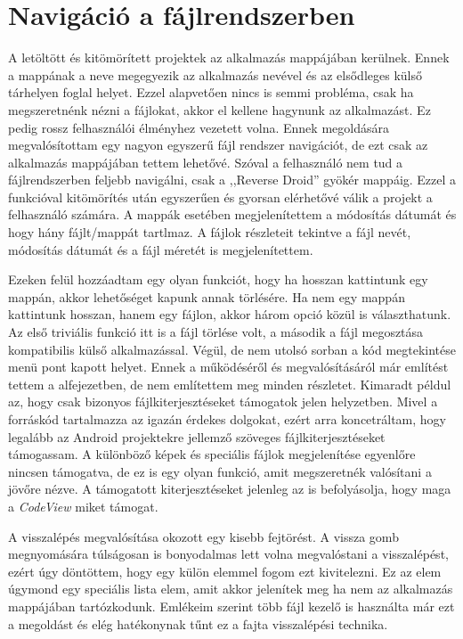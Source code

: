 \documentclass{thesis-ekf}
\theoremstyle{definition}
\theoremstyle{remark}
\begin{document}
\section{Navigáció a fájlrendszerben}

A letöltött és kitömörített projektek az alkalmazás mappájában kerülnek.
Ennek a mappának a neve megegyezik az alkalmazás nevével és az elsődleges külső tárhelyen foglal helyet.
Ezzel alapvetően nincs is semmi probléma, csak ha megszeretnénk nézni a fájlokat, akkor el kellene hagynunk az alkalmazást.
Ez pedig rossz felhasználói élményhez vezetett volna.
Ennek megoldására megvalósítottam egy nagyon egyszerű fájl rendszer navigációt, de ezt csak az alkalmazás mappájában tettem lehetővé.
Szóval a felhasználó nem tud a fájlrendszerben feljebb navigálni, csak a ,,Reverse Droid'' gyökér mappáig.
Ezzel a funkcióval kitömörítés után egyszerűen és gyorsan elérhetővé válik a projekt a felhasználó számára.
A mappák esetében megjelenítettem a módosítás dátumát és hogy hány fájlt/mappát tartlmaz.
A fájlok részleteit tekintve a fájl nevét, módosítás dátumát és a fájl méretét is megjelenítettem.

Ezeken felül hozzáadtam egy olyan funkciót, hogy ha hosszan kattintunk egy mappán, akkor lehetőséget kapunk annak törlésére.
Ha nem egy mappán kattintunk hosszan, hanem egy fájlon, akkor három opció közül is választhatunk.
Az első triviális funkció itt is a fájl törlése volt, a második a fájl megosztása kompatibilis külső alkalmazással.
Végül, de nem utolsó sorban a kód megtekintése menü pont kapott helyet.
Ennek a működéséről és megvalósításáról már említést tettem a  alfejezetben, de nem említettem meg minden részletet.
Kimaradt példul az, hogy csak bizonyos fájlkiterjesztéseket támogatok jelen helyzetben.
Mivel a forráskód tartalmazza az igazán érdekes dolgokat, ezért arra koncetráltam, hogy legalább az Android projektekre jellemző szöveges fájlkiterjesztéseket támogassam.
A különböző képek és speciális fájlok megjelenítése egyenlőre nincsen támogatva, de ez is egy olyan funkció, amit megszeretnék valósítani a jövőre nézve.
A támogatott kiterjesztéseket jelenleg az is befolyásolja, hogy maga a \emph{CodeView} miket támogat.

A visszalépés megvalósítása okozott egy kisebb fejtörést.
A vissza gomb megnyomására túlságosan is bonyodalmas lett volna megvalóstani a visszalépést, ezért úgy döntöttem, hogy egy külön elemmel fogom ezt kivitelezni.
Ez az elem úgymond egy speciális lista elem, amit akkor jelenítek meg ha nem az alkalmazás mappájában tartózkodunk.
Emlékeim szerint több fájl kezelő is használta már ezt a megoldást és elég hatékonynak tűnt ez a fajta visszalépési technika.
\end{document}
